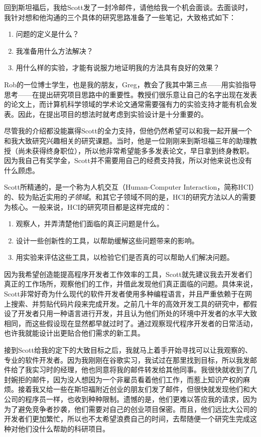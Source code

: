 \documentclass[12pt,UTF8,nofonts]{book}
\begin{document}
回到斯坦福后，我给Scott发了一封冷邮件，请他给我一个机会面谈。去面谈时，我针对想和他沟通的三个具体的研究思路准备了一些笔记，大致格式如下：

\begin{enumerate}
\item 问题的定义是什么？
\item 我准备用什么方法解决？
\item 用什么样的实验，才能有说服力地证明我的方法具有良好的效果？
\end{enumerate}

Rob的一位博士学生，也是我的朋友，Greg，教会了我其中第三点——用实验指导思考——在提出研究项目思路中的重要性。教授们很乐意让自己的名字出现在发表的论文上，而计算机科学领域的学术论文通常需要强有力的实验支持才能有机会发表。因此，在提出项目的想法时就考虑到实验设计是十分重要的。

尽管我的介绍都没能赢得Scott的全力支持，但他仍然希望可以和我一起开展一个和我大致研究兴趣相关的研究课题。当时，他是一位刚刚来到斯坦福三年的助理教授（尚未获得终身职位），所以他非常希望能多多发表论文，早日拿到终身教职。因为我自己有奖学金，Scott并不需要用自己的经费支持我，所以对他来说也没有什么顾虑。

\breakline

Scott所精通的，是一个称为人机交互（Human-Computer Interaction，简称HCI）的、较为贴近实用的\emph{子领域}。和其它子领域不同的是，HCI的研究方法以人的需要为核心。一般来说，HCI的研究项目都是这样完成的：

\begin{enumerate}
\item 观察人，并弄清楚他们面临的真正问题是什么。
\item 设计一些创新性的工具，以帮助缓解这些问题带来的影响。
\item 用实验来评估这些工具，以检验它们是否真的可以帮助人们解决问题。
\end{enumerate}

因为我希望创造能提高程序开发者工作效率的工具，Scott就先建议我去开发者们真正的工作场所，观察他们的工作，并借此发现他们真正面临的问题。具体来说，Scott非常好奇为什么现代的软件开发者使用多种编程语言，并且严重依赖于在网上搜索、并剪贴代码片段来完成开发。之前几十年的高效开发工具的研究中，都假设了开发者只用一种语言进行开发，并且认为他们所处的环境中开发者的水平大致相同，而这些假设现在显然都早就过时了。通过观察现代程序开发者的日常活动，也许我就能设计出更贴合他们需求的新工具。

接到Scott给我的定下的大致目标之后，我就马上着手开始寻找可以让我观察的、专业的软件开发者。因为我刚刚在谷歌实习，我试过在那里找到目标，所以我发邮件给了我实习时的经理，他也同意将我的邮件转发给其他同事。我很快就收到了几封婉拒的邮件，因为没人想因为一个非雇员看着他们工作，而惹上知识产权的麻烦。接着我又给一些在斯坦福附近创业的朋友们发了邮件，但很快就发现他们和大公司的程序员一样，也收到种种限制。遗憾的是，他们更难以答应我的请求，因为为了避免竞争者抄袭，他们需要对自己的创业项目保密。而且，他们远比大公司的开发者们更加繁忙，所以也不太希望浪费自己的时间，去帮随便一个研究生完成这种对他们没什么帮助的科研项目。
\end{document}
